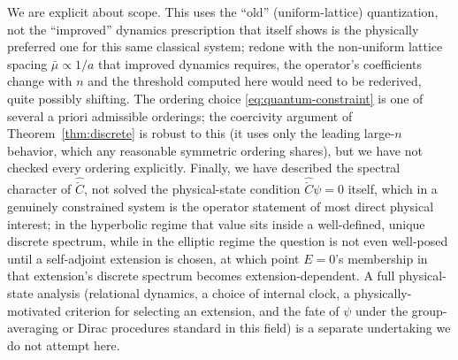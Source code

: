 \documentclass[11pt]{amsart}
\theoremstyle{remark}
\begin{document}
We are explicit about scope. This uses the ``old'' (uniform-lattice) quantization, not the ``improved'' dynamics prescription \cite{APS2} that \cite{CendalGarayGaray} itself shows is the physically preferred one for this same classical system; redone with the non-uniform lattice spacing $\bar\mu\propto1/a$ that improved dynamics requires, the operator's coefficients change with $n$ and the threshold computed here would need to be rederived, quite possibly shifting. The ordering choice \eqref{eq:quantum-constraint} is one of several a priori admissible orderings; the coercivity argument of Theorem~\ref{thm:discrete} is robust to this (it uses only the leading large-$n$ behavior, which any reasonable symmetric ordering shares), but we have not checked every ordering explicitly. Finally, we have described the spectral character of $\hat{\check C}$, not solved the physical-state condition $\hat{\check C}\psi=0$ itself, which in a genuinely constrained system is the operator statement of most direct physical interest; in the hyperbolic regime that value sits inside a well-defined, unique discrete spectrum, while in the elliptic regime the question is not even well-posed until a self-adjoint extension is chosen, at which point $E=0$'s membership in that extension's discrete spectrum becomes extension-dependent. A full physical-state analysis (relational dynamics, a choice of internal clock, a physically-motivated criterion for selecting an extension, and the fate of $\psi$ under the group-averaging or Dirac procedures standard in this field) is a separate undertaking we do not attempt here.
\end{document}

